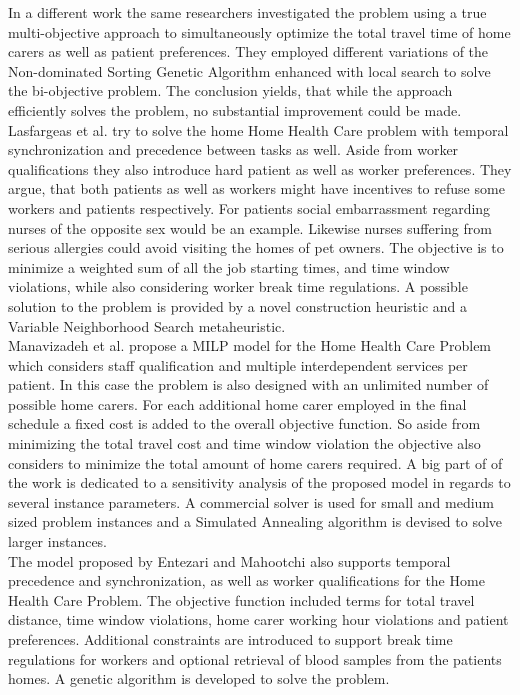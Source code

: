 In a different work \cite{haddadeneNSGAIIEnhancedLocal2016} the same researchers investigated the problem using a true multi-objective approach to simultaneously optimize the total travel time of home carers as well as patient preferences. They employed different variations of the Non-dominated Sorting Genetic Algorithm enhanced with local search to solve the bi-objective problem. The conclusion yields, that while the approach efficiently solves the problem, no substantial improvement could be made.\\ %
%
Lasfargeas et al. \cite{lasfargeasSolvingHomeHealth2019} try to solve the home Home Health Care problem with temporal synchronization and precedence between tasks as well. Aside from worker qualifications they also introduce hard patient as well as worker preferences. They argue, that both patients as well as workers might have incentives to refuse some workers and patients respectively. For patients social embarrassment regarding nurses of the opposite sex would be an example. Likewise nurses suffering from serious allergies could avoid visiting the homes of pet owners. The objective is to minimize a weighted sum of all the job starting times, and time window violations, while also considering worker break time regulations. A possible solution to the problem is provided by a novel construction heuristic and a Variable Neighborhood Search metaheuristic.\\
%
Manavizadeh et al. \cite{manavizadehUsingMetaheuristicAlgorithm2020} propose a MILP model for the Home Health Care Problem which considers staff qualification and multiple interdependent services per patient. In this case the problem is also designed with an unlimited number of possible home carers. For each additional home carer employed in the final schedule a fixed cost is added to the overall objective function. So aside from minimizing the total travel cost and time window violation the objective also considers to minimize the total amount of home carers required. A big part of of the work is dedicated to a sensitivity analysis of the proposed model in regards to several instance parameters. A commercial solver is used for small and medium sized problem instances and a Simulated Annealing algorithm is devised to solve larger instances.\\
%
The model proposed by Entezari and Mahootchi \cite{entezariDevelopingMathematicalModel2020} also supports temporal precedence and synchronization, as well as worker qualifications for the Home Health Care Problem. The objective function included terms for total travel distance, time window violations, home carer working hour violations and patient preferences. Additional constraints are introduced to support break time regulations for workers and optional retrieval of blood samples from the patients homes. A genetic algorithm is developed to solve the problem.\\ \\ 
